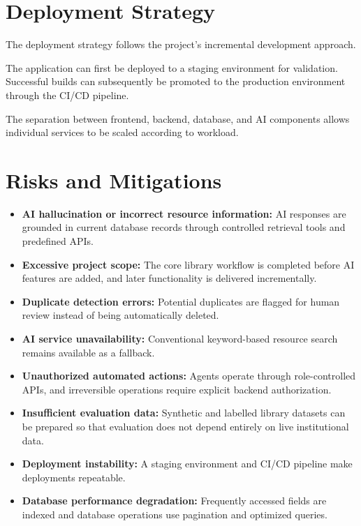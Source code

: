 \documentclass{tietreport}
\begin{document}
\section{Deployment Strategy}

The deployment strategy follows the project's incremental development
approach.

The application can first be deployed to a staging environment for
validation. Successful builds can subsequently be promoted to the
production environment through the CI/CD pipeline.

The separation between frontend, backend, database, and AI components
allows individual services to be scaled according to workload.


\section{Risks and Mitigations}

\begin{itemize}

    \item \textbf{AI hallucination or incorrect resource information:}
    AI responses are grounded in current database records through
    controlled retrieval tools and predefined APIs.

    \item \textbf{Excessive project scope:}
    The core library workflow is completed before AI features are added,
    and later functionality is delivered incrementally.

    \item \textbf{Duplicate detection errors:}
    Potential duplicates are flagged for human review instead of being
    automatically deleted.

    \item \textbf{AI service unavailability:}
    Conventional keyword-based resource search remains available as a
    fallback.

    \item \textbf{Unauthorized automated actions:}
    Agents operate through role-controlled APIs, and irreversible
    operations require explicit backend authorization.

    \item \textbf{Insufficient evaluation data:}
    Synthetic and labelled library datasets can be prepared so that
    evaluation does not depend entirely on live institutional data.

    \item \textbf{Deployment instability:}
    A staging environment and CI/CD pipeline make deployments repeatable.

    \item \textbf{Database performance degradation:}
    Frequently accessed fields are indexed and database operations use
    pagination and optimized queries.

\end{itemize}
\end{document}
